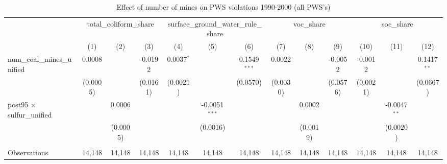 
\begin{table}[htbp]
   \caption{\label{olsrf2sls_nummine_non_mine_vio_1990to2000allhucs_coalunified} Effect of number of mines on PWS violations 1990-2000 (all PWS's)}
   \bigskip
   \centering
   \begin{adjustbox}{width = \textwidth, center}
      \begin{tabular}{lcccccccccccc}
         \toprule
          & \multicolumn{3}{c}{total\_coliform\_share} & \multicolumn{3}{c}{surface\_ground\_water\_rule\_share} & \multicolumn{3}{c}{voc\_share} & \multicolumn{3}{c}{soc\_share}\\
                                                          & (1)           & (2)           & (3)           & (4)           & (5)             & (6)            & (7)                   & (8)                   & (9)                   & (10)                  & (11)           & (12)\\  
         \midrule 
         num\_coal\_mines\_unified                        & 0.0008        &               & -0.0192       & 0.0037$^{*}$  &                 & 0.1549$^{***}$ & 0.0022                &                       & -0.0052               & -0.0012               &                & 0.1417$^{**}$\\   
                                                          & (0.0005)      &               & (0.0161)      & (0.0021)      &                 & (0.0570)       & (0.0030)              &                       & (0.0576)              & (0.0021)              &                & (0.0667)\\   
         post95 $\times$ sulfur\_unified                  &               & 0.0006        &               &               & -0.0051$^{***}$ &                &                       & 0.0002                &                       &                       & -0.0047$^{**}$ &   \\   
                                                          &               & (0.0005)      &               &               & (0.0016)        &                &                       & (0.0019)              &                       &                       & (0.0020)       &   \\   
          \\
         Observations                                     & 14,148        & 14,148        & 14,148        & 14,148        & 14,148          & 14,148         & 14,148                & 14,148                & 14,148                & 14,148                & 14,148         & 14,148\\  

\end{tabular}
\end{adjustbox}
\end{table}

